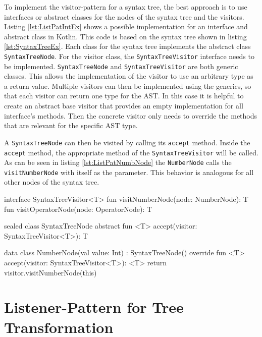 To implement the visitor-pattern for a syntax tree, the best approach is to use interfaces or abstract classes for the nodes of the syntax tree and the visitors. Listing \ref{lst:ListPatIntEx} shows a possible implementation for an interface and abstract class in Kotlin. This code is based on the syntax tree shown in listing \ref{lst:SyntaxTreeEx}. Each class for the syntax tree implements the  abstract class \texttt{SyntaxTreeNode}. For the visitor class, the \texttt{SyntaxTreeVisitor} interface needs to be implemented. \texttt{SyntaxTreeNode} and \texttt{SyntaxTreeVisitor} are both generic classes. This allows the implementation of the visitor to use an arbitrary type as a return value. Multiple visitors can then be implemented using the generics, so that each visitor can return one type for the AST. In this case it is helpful to create an abstract base visitor that provides an empty implementation for all interface's methods. Then the concrete visitor only needs to override the methods that are relevant for the specific AST type.  

A \texttt{SyntaxTreeNode} can then be visited by calling its \texttt{accept} method. Inside the \texttt{accept} method, the appropriate method of the \texttt{SyntaxTreeVisitor} will be called. As can be seen in listing \ref{lst:ListPatNumbNode} the \texttt{NumberNode} calls the \texttt{visitNumberNode} with itself as the parameter. This behavior is analogous for all other nodes of the syntax tree. 


\begin{KotlinCode}[float,numbers=none,caption=Interface and abstract class used to implement the visitor-pattern., label=lst:ListPatIntEx]
interface SyntaxTreeVisitor<T> {
    fun visitNumberNode(node: NumberNode): T
    fun visitOperatorNode(node: OperatorNode): T
}

sealed class SyntaxTreeNode {
    abstract fun <T> accept(visitor: SyntaxTreeVisitor<T>): T
}
\end{KotlinCode}


\begin{KotlinCode}[float,numbers=none,caption=Implementation of the \texttt{NumberNode} class inheriting from the \texttt{SyntaxTreeNode}., label=lst:ListPatNumbNode]
data class NumberNode(val value: Int) : SyntaxTreeNode() {
    override fun <T> accept(visitor: SyntaxTreeVisitor<T>): <T> {
        return visitor.visitNumberNode(this)
    }
}
\end{KotlinCode}


\section{Listener-Pattern for Tree Transformation}

